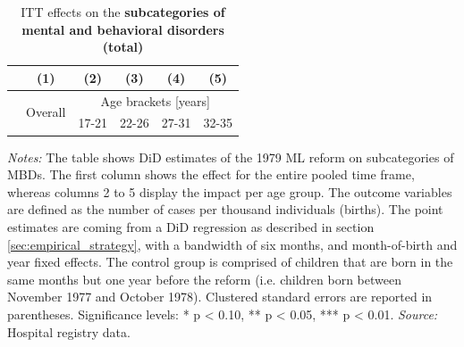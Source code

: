 \documentclass[11pt, a4paper, draft]{article} %
\begin{document}
\newpage
{} 
\vspace*{\fill}
\begin{table}[H] \centering 
	\begin{threeparttable} \centering \caption{ITT effects on the \textbf{subcategories of mental and behavioral disorders (total)}}\label{tab: ITT_across_d5subcategories_per_age_group_total}
		{\def\sym#1{\ifmmode^{#1}\else\(^{#1}\)\fi} 
			\begin{tabular}{l*{5}{c}}
				\toprule 
				&\multicolumn{1}{c}{(1)}&\multicolumn{1}{c}{(2)}&\multicolumn{1}{c}{(3)}&\multicolumn{1}{c}{(4)}&\multicolumn{1}{c}{(5)}\\
				\midrule
				&\multirow{2}{*}{Overall} & \multicolumn{4}{c}{Age brackets [years]} \\ 
				\cmidrule(lr){3-6}
				&&\multicolumn{1}{c}{17-21}&\multicolumn{1}{c}{22-26}&\multicolumn{1}{c}{27-31}&\multicolumn{1}{c}{32-35}\\
				
				\midrule
				
				
				
				\bottomrule 
		\end{tabular}}
	\end{threeparttable} 
	\begin{minipage}{0.9\linewidth}
		\scriptsize \emph{Notes:} The table shows DiD estimates of the 1979 ML reform on subcategories of MBDs. The first column shows the effect for the entire pooled time frame, whereas columns 2 to 5 display the impact per age group. The outcome variables are defined as the number of cases per thousand individuals (births). The point estimates are coming from a DiD regression as described in section \ref{sec:empirical_strategy}, with a bandwidth of six months, and month-of-birth and year fixed effects. The control group is comprised of children that are born in the same months but one year before the reform (i.e. children born between November 1977 and October 1978). Clustered standard errors are reported in parentheses. \newline Significance levels: * p < 0.10, ** p < 0.05, *** p < 0.01. \newline 	\emph{Source:} Hospital registry data.
	\end{minipage}
\end{table} 
\vspace*{\fill}\clearpage 
\restoregeometry
\newpage
{} 

\restoregeometry
\end{document}
